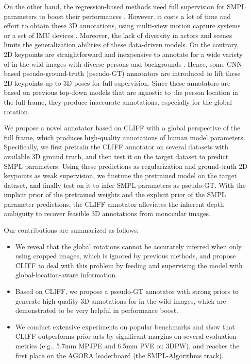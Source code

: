 \documentclass[runningheads]{llncs}
\begin{document}
On the other hand, the regression-based methods need full supervision for SMPL parameters to boost their performances \cite{kolotouros2019learning}.
However, it costs a lot of time and effort to obtain these 3D annotations, using multi-view motion capture systems \cite{ionescu2013human3,mehta2017monocular} or a set of IMU devices \cite{trumble2017total,von2018recovering}.
Moreover, the lack of diversity in actors and scenes limits the generalization abilities of these data-driven models.
On the contrary, 2D keypoints are straightforward and inexpensive to annotate for a wide variety of in-the-wild images with diverse persons and backgrounds \cite{lin2014microsoft,andriluka20142d}.
Hence, some CNN-based pseudo-ground-truth (pseudo-GT) annotators \cite{kolotouros2019learning,joo2021exemplar,moon2020neuralannot} are introduced to lift these 2D keypoints up to 3D poses for full supervision.
Since these annotators are based on previous top-down models that are agnostic to the person location in the full frame, they produce inaccurate annotations, especially for the global rotation.

We propose a novel annotator based on CLIFF with a global perspective of the full frame, which produces high-quality annotations of human model parameters.
Specifically, we first pretrain the CLIFF annotator on several datasets with available 3D ground truth,
and then test it on the target dataset to predict SMPL parameters.
Using these predictions as regularization and ground-truth 2D keypoints as weak supervision, we finetune the pretrained model on the target dataset,
and finally test on it to infer SMPL parameters as pseudo-GT.
With the implicit prior of the pretrained weights and the explicit prior of the SMPL parameter predictions, the CLIFF annotator alleviates the inherent depth ambiguity to recover feasible 3D annotations from monocular images.



Our contributions are summarized as follows:
\begin{itemize}
\item We reveal that the global rotations cannot be accurately inferred when only using cropped images, which is ignored by previous methods, and propose CLIFF to deal with this problem by feeding and supervising the model with global-location-aware information.
\item Based on CLIFF, we propose a pseudo-GT annotator with strong priors to generate high-quality 3D annotations for in-the-wild images, which are demonstrated to be very helpful in performance boost.
\item We conduct extensive experiments on popular benchmarks and show that CLIFF outperforms prior arts by significant margins on several evaluation metrics (e.g., 5.7mm MPJPE and 6.5mm PVE on 3DPW), and reaches the first place on the AGORA leaderboard (the SMPL-Algorithms track).
\end{itemize}
\end{document}

